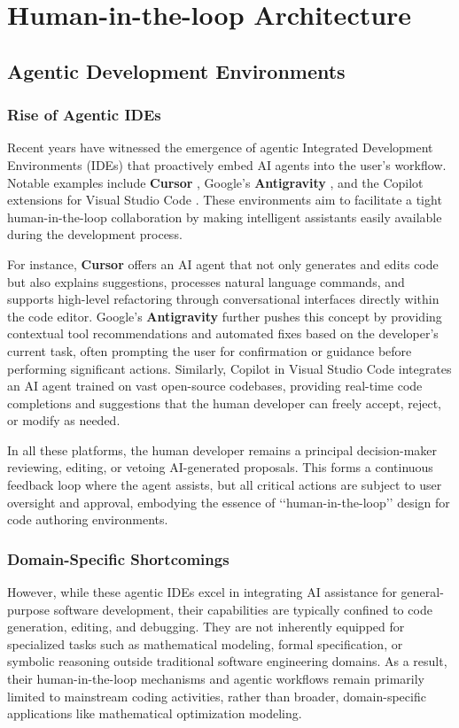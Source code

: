 \section{Human-in-the-loop Architecture}

\subsection{Agentic Development Environments}

\subsubsection{Rise of Agentic IDEs}
Recent years have witnessed the emergence of agentic Integrated Development Environments (IDEs) that proactively embed AI agents into the user’s workflow. Notable examples include \textbf{Cursor} \cite{cursor}, Google’s \textbf{Antigravity} \cite{antigravity}, and the Copilot extensions for Visual Studio Code \cite{visualstudio}. These environments aim to facilitate a tight human-in-the-loop collaboration by making intelligent assistants easily available during the development process.

For instance, \textbf{Cursor} offers an AI agent that not only generates and edits code but also explains suggestions, processes natural language commands, and supports high-level refactoring through conversational interfaces directly within the code editor. Google's \textbf{Antigravity} further pushes this concept by providing contextual tool recommendations and automated fixes based on the developer’s current task, often prompting the user for confirmation or guidance before performing significant actions. Similarly, Copilot in Visual Studio Code integrates an AI agent trained on vast open-source codebases, providing real-time code completions and suggestions that the human developer can freely accept, reject, or modify as needed.

In all these platforms, the human developer remains a principal decision-maker reviewing, editing, or vetoing AI-generated proposals. This forms a continuous feedback loop where the agent assists, but all critical actions are subject to user oversight and approval, embodying the essence of ‘‘human-in-the-loop’’ design for code authoring environments.

\subsubsection{Domain-Specific Shortcomings}
However, while these agentic IDEs excel in integrating AI assistance for general-purpose software development, their capabilities are typically confined to code generation, editing, and debugging. They are not inherently equipped for specialized tasks such as mathematical modeling, formal specification, or symbolic reasoning outside traditional software engineering domains. As a result, their human-in-the-loop mechanisms and agentic workflows remain primarily limited to mainstream coding activities, rather than broader, domain-specific applications like mathematical optimization modeling.


